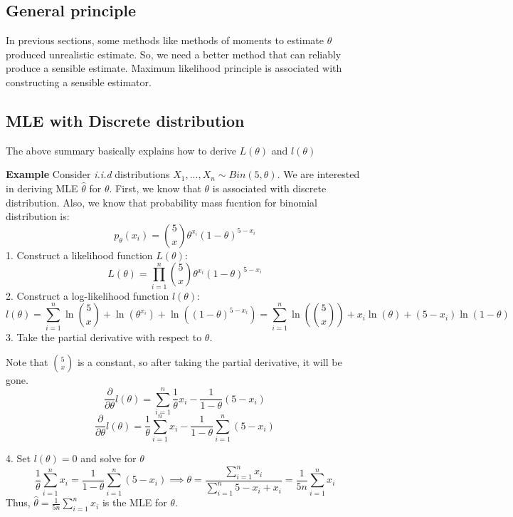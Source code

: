 \documentclass[a4paper]{article}
\begin{document}
\subsection{General principle}
In previous sections, some methods like methods of moments to estimate $\theta$ produced unrealistic estimate. 
So, we need a better method that can reliably produce a sensible estimate.
Maximum likelihood principle is associated with constructing a sensible estimator. 
\subsection{MLE with Discrete distribution}
The above summary basically explains how to derive $L(\theta)$ and $l(\theta)$
\begin{mdframed}
    \textbf{Example}
    \newline
    Consider \textit{i.i.d} distributions $X_1, ...,X_n \sim Bin(5,\theta)$. We are interested in deriving MLE $\hat{\theta}$ for $\theta$.
    First, we know that $\theta$ is associated with discrete distribution. Also, we know that probability mass fucntion for binomial distribution is: 
    $$p_{\theta}(x_i) = {5\choose x}\theta^{x_i}(1-\theta)^{5-x_i}$$
    1. Construct a likelihood function $L(\theta)$:
    $$L(\theta)=\prod_{i=1}^{n}{5\choose x}\theta^{x_i}(1-\theta)^{5-x_i}$$
    2. Construct a log-likelihood function $l(\theta)$:
    $$l(\theta) = \sum_{i=1}^{n}\ln{5\choose x}+\ln(\theta^{x_i})+\ln((1-\theta)^{5-x_i})=\sum_{i=1}^{n}\ln({5\choose x})+x_i\ln(\theta)+(5-x_i)\ln(1-\theta)$$
    3. Take the partial derivative with respect to $\theta$.
    
    Note that ${5\choose x}$ is a constant, so after taking the partial derivative, it will be gone.
    $$\frac{\partial}{\partial\theta}l(\theta)=\sum_{i=1}^{n}\frac{1}{\theta}x_i-\frac{1}{1-\theta}(5-x_i)$$
    $$\frac{\partial}{\partial\theta}l(\theta)=\frac{1}{\theta}\sum_{i=1}^{n}x_i-\frac{1}{1-\theta}\sum_{i=1}^{n}(5-x_i)$$

    4. Set $l(\theta) = 0$ and solve for $\theta$
    $$\frac{1}{\theta}\sum_{i=1}^{n}x_i=\frac{1}{1-\theta}\sum_{i=1}^{n}(5-x_i) \implies \theta = \frac{\sum_{i=1}^{n}x_i}{\sum_{i=1}^{n}5-x_i+x_i}=\frac{1}{5n}\sum_{i=1}^{n}x_i$$
    Thus, $\hat{\theta} = \frac{1}{5n}\sum_{i=1}^{n}x_i$ is the MLE for $\theta$.


\end{mdframed}
\end{document}
